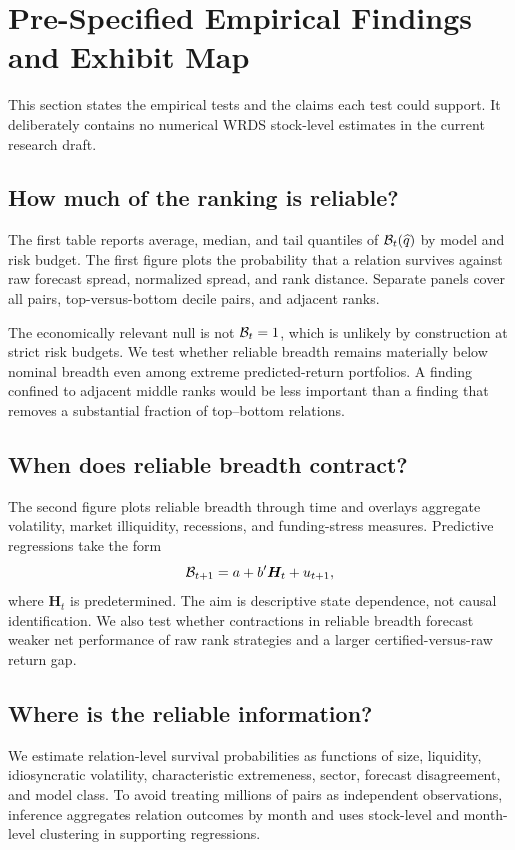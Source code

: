 \section{Pre-Specified Empirical Findings and Exhibit Map}
\label{sec:empirical-map}

This section states the empirical tests and the claims each test could support. It deliberately contains no numerical WRDS stock-level estimates in the current research draft.

\subsection{How much of the ranking is reliable?}

The first table reports average, median, and tail quantiles of $\mathcal B_t(\widehat q)$ by model and risk budget. The first figure plots the probability that a relation survives against raw forecast spread, normalized spread, and rank distance. Separate panels cover all pairs, top-versus-bottom decile pairs, and adjacent ranks.

The economically relevant null is not $\mathcal B_t=1$, which is unlikely by construction at strict risk budgets. We test whether reliable breadth remains materially below nominal breadth even among extreme predicted-return portfolios. A finding confined to adjacent middle ranks would be less important than a finding that removes a substantial fraction of top--bottom relations.

\subsection{When does reliable breadth contract?}

The second figure plots reliable breadth through time and overlays aggregate volatility, market illiquidity, recessions, and funding-stress measures. Predictive regressions take the form
\[
\mathcal B_{t+1}
=
a+b^{\prime}\bm H_t+u_{t+1},
\]
where $\bm H_t$ is predetermined. The aim is descriptive state dependence, not causal identification. We also test whether contractions in reliable breadth forecast weaker net performance of raw rank strategies and a larger certified-versus-raw return gap.

\subsection{Where is the reliable information?}

We estimate relation-level survival probabilities as functions of size, liquidity, idiosyncratic volatility, characteristic extremeness, sector, forecast disagreement, and model class. To avoid treating millions of pairs as independent observations, inference aggregates relation outcomes by month and uses stock-level and month-level clustering in supporting regressions.

